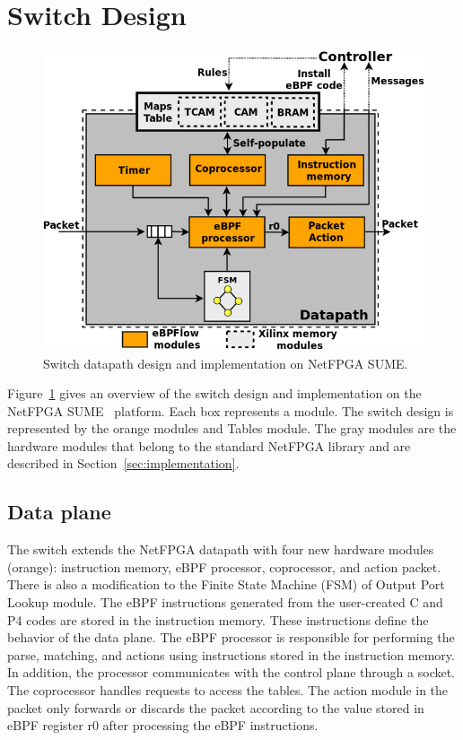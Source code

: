 \section{Switch Design}
\label{sec:design}

\begin{figure}[!htbp]
\centering
\includegraphics[width=.6\textwidth]{figures/06_fig01.png}
\caption{Switch datapath design and implementation on NetFPGA SUME.}
\label{fig:06_fig01}
\end{figure}

Figure~\ref{fig:06_fig01} gives an overview of the switch design and implementation on the NetFPGA SUME~\cite{SUME2014} platform. 
Each box represents a module.
The switch design is represented by the orange modules and Tables module.
The gray modules are the hardware modules that belong to the standard NetFPGA library and are described in Section~\ref{sec:implementation}.


\subsection{Data plane}

The switch extends the NetFPGA datapath with four new hardware modules (orange): instruction memory, eBPF processor, coprocessor, and action packet. There is also a modification to the Finite State Machine (FSM) of Output Port Lookup module. The eBPF instructions generated from the user-created C and P4 codes are stored in the instruction memory. These instructions define the behavior of the data plane. The eBPF processor is responsible for performing the parse, matching, and actions using instructions stored in the instruction memory. In addition, the processor communicates with the control plane through a socket. The coprocessor handles requests to access the tables. The action module in the packet only forwards or discards the packet according to the value stored in eBPF register r0 after processing the eBPF instructions. %

